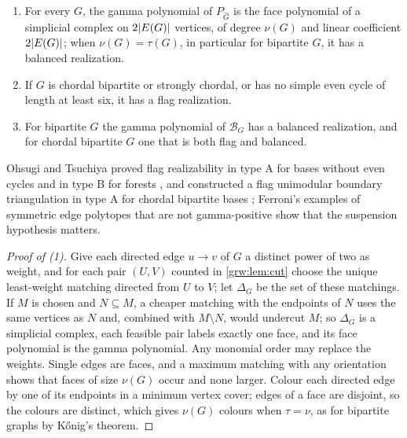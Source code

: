 \begin{theorem}\label{grw:thm:faces}
\begin{enumerate}[label=\textup{(\arabic*)}]
\item For every $G$, the gamma polynomial of $P_{\widehat G}$ is the face
polynomial of a simplicial complex on $2\lvert E(G)\rvert$ vertices, of degree
$\nu(G)$ and linear coefficient $2\lvert E(G)\rvert$; when $\nu(G)=\tau(G)$, in
particular for bipartite $G$, it has a balanced realization.
\item If $G$ is chordal bipartite or strongly chordal, or has no simple even
cycle of length at least six, it has a flag realization.
\item For bipartite $G$ the gamma polynomial of $\mathcal B_G$ has a
balanced realization, and for chordal bipartite $G$ one that is both flag
and balanced.
\end{enumerate}
\end{theorem}

Ohsugi and Tsuchiya proved flag realizability in type A for bases without
even cycles and in type B for forests
\cite[Theorems~1.3 and~7.5]{OhsugiTsuchiya2021Symmetric}, and constructed a
flag unimodular boundary triangulation in type A for chordal bipartite bases
\cite[Theorem~6.9]{OhsugiTsuchiya2021Symmetric}; Ferroni's examples of
symmetric edge polytopes that are not gamma-positive
\cite{Ferroni2026Symmetric} show that the suspension hypothesis matters.

\begin{proof}[Proof of \textup{(1)}]
Give each directed edge $u\to v$ of $G$ a distinct power of two as weight,
and for each pair $(U,V)$ counted in \cref{grw:lem:cut} choose the unique
least-weight matching directed from $U$ to $V$; let $\Delta_G$ be the set of
these matchings. If $M$ is chosen and $N\subseteq M$, a cheaper matching with
the endpoints of $N$ uses the same vertices as $N$ and, combined with
$M\setminus N$, would undercut $M$; so $\Delta_G$ is a simplicial complex,
each feasible pair labels exactly one face, and its face polynomial is the
gamma polynomial. Any monomial order may replace the weights. Single edges
are faces, and a maximum matching with any orientation shows that faces of
size $\nu(G)$ occur and none larger. Colour each directed edge by one of its
endpoints in a minimum vertex cover; edges of a face are disjoint, so the
colours are distinct, which gives $\nu(G)$ colours when $\tau=\nu$, as for
bipartite graphs by K\H{o}nig's theorem.
\end{proof}

